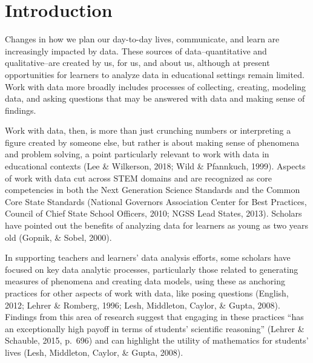 \documentclass[]{msu-thesis}
\theoremstyle{definition}
\theoremstyle{definition}
\theoremstyle{definition}
\theoremstyle{remark}
\begin{document}
\SingleSpacing
\tableofcontents* %
\clearpage
\listoftables %
\clearpage
\listoffigures %
\mainmatter
%

\chapter{Introduction}\label{intro}

\DoubleSpacing

Changes in how we plan our day-to-day lives, communicate, and learn are
increasingly impacted by data. These sources of data--quantitative and
qualitative--are created by us, for us, and about us, although at
present opportunities for learners to analyze data in educational
settings remain limited. Work with data more broadly includes processes
of collecting, creating, modeling data, and asking questions that may be
answered with data and making sense of findings.

Work with data, then, is more than just crunching numbers or
interpreting a figure created by someone else, but rather is about
making sense of phenomena and problem solving, a point particularly
relevant to work with data in educational contexts (Lee \& Wilkerson,
2018; Wild \& Pfannkuch, 1999). Aspects of work with data cut across
STEM domains and are recognized as core competencies in both the Next
Generation Science Standards and the Common Core State Standards
(National Governors Association Center for Best Practices, Council of
Chief State School Officers, 2010; NGSS Lead States, 2013). Scholars
have pointed out the benefits of analyzing data for learners as young as
two years old (Gopnik, \& Sobel, 2000).

In supporting teachers and learners' data analysis efforts, some
scholars have focused on key data analytic processes, particularly those
related to generating measures of phenomena and creating data models,
using these as anchoring practices for other aspects of work with data,
like posing questions (English, 2012; Lehrer \& Romberg, 1996; Lesh,
Middleton, Caylor, \& Gupta, 2008). Findings from this area of research
suggest that engaging in these practices ``has an exceptionally high
payoff in terms of students' scientific reasoning'' (Lehrer \& Schauble,
2015, p.~696) and can highlight the utility of mathematics for students'
lives (Lesh, Middleton, Caylor, \& Gupta, 2008).
\end{document}
